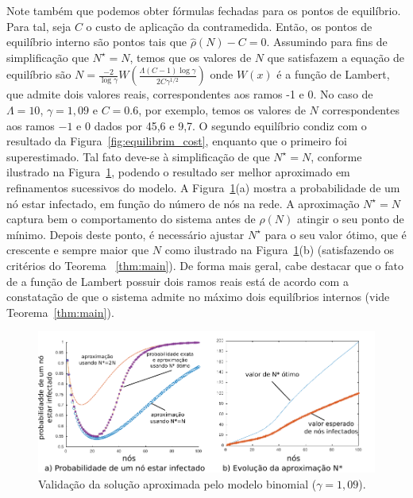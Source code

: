         Note também que podemos obter fórmulas fechadas para os pontos de equilíbrio.
        Para tal, seja $C$ o custo de aplicação da contramedida.  Então, os pontos de equilíbrio interno são pontos tais que $\hat{\rho} (N) - C = 0$. 
		Assumindo para fins de simplificação que  $N^{\star}=N$, temos que 
		os valores de $N$ que satisfazem a equação de equilíbrio são  
		$N = \frac{-2}{\log \gamma}    W \left(\frac{\Lambda (C-1) \log\gamma}{2C \gamma^{1/2} }  \right)$ 
		onde $W(x)$ é a função de Lambert, que admite dois valores reais, correspondentes aos ramos -1 e 0.  
		No caso de $\Lambda = 10$, $\gamma = 1,09$ e $C = 0.6$, por exemplo, temos os valores de $N$ correspondentes aos ramos $-1$ e $0$  dados por 45,6 e  9,7.  O segundo equilíbrio condiz com o  resultado da   Figura~\ref{fig:equilibrim_cost}, enquanto que o primeiro foi superestimado. Tal fato deve-se à simplificação de que $N^{\star}=N$, conforme ilustrado na Figura~\ref{fig:result_01b}, podendo o resultado ser melhor aproximado em refinamentos sucessivos do modelo. 
		A Figura~\ref{fig:result_01b}(a) mostra a probabilidade de um nó estar infectado, em função do número de nós na rede.  A aproximação $N^{\star}=N$ captura bem o comportamento do sistema antes de $\rho(N)$ atingir o seu ponto de mínimo. Depois deste ponto, é necessário ajustar $N^{\star}$ para o seu valor ótimo, que é crescente e sempre maior que $N$ como ilustrado na Figura~\ref{fig:result_01b}(b) (satisfazendo os critérios do Teorema ~\ref{thm:main}).  
		De forma mais geral, cabe destacar que o fato de a   função de Lambert possuir dois ramos reais  está de acordo com a constatação de que o sistema admite  no máximo dois equilíbrios internos (vide Teorema~\ref{thm:main}).   

        \begin{figure}[!htb]
    		\centering
    	    \hspace{-0.2in}	
            \includegraphics[width=0.99\columnwidth,keepaspectratio=false]{./img/aproximacoes_N_ast.pdf}
    		\caption{Validação da solução aproximada pelo modelo binomial ($\gamma=1,09$).}
    		\label{fig:result_01b}
        \end{figure}
        
        
